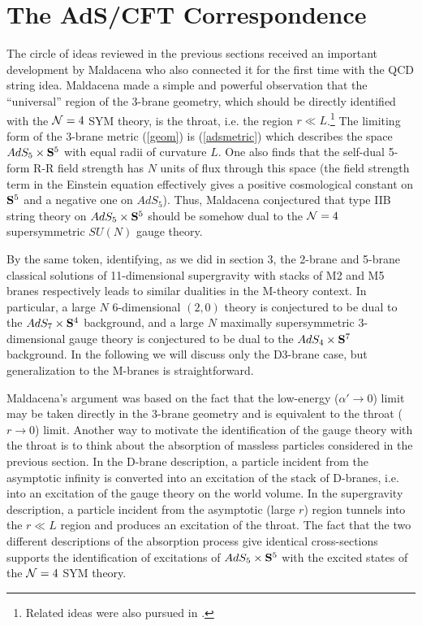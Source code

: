 \documentclass[12pt]{article}
\begin{document}
\section{The AdS/CFT Correspondence}

The circle of ideas reviewed in the previous sections received
an important development by Maldacena \cite{jthroat} who also connected
it for the first time with the QCD string idea. Maldacena made
a simple and powerful observation that the ``universal'' region of
the 3-brane geometry, which should be directly identified with the
${\cal N}=4$ SYM theory, is the throat, i.e. the region $r\ll L$.\footnote{
Related ideas were also pursued in \cite{HYU}.} The
limiting form of the 3-brane metric (\ref{geom}) is (\ref{adsmetric})
which describes the space
$AdS_5\times {\bf S}^5$ with equal radii of curvature $L$.
One also finds that the self-dual 5-form R-R field strength
has $N$ units of flux through this space (the field strength term in the
Einstein equation effectively gives a positive cosmological 
constant on ${\bf S}^5$
and a negative one on $AdS_5$).
Thus, Maldacena conjectured that type IIB string theory on 
$AdS_5\times {\bf S}^5$
should be somehow dual to the 
${\cal N}=4$ supersymmetric
$SU(N)$ gauge theory.

By the same token, identifying, as we did in section 3,
the 2-brane and 5-brane
classical solutions
of 11-dimensional supergravity with stacks of M2 and M5 branes respectively
leads to similar dualities in the M-theory
context. In particular, a large $N$ 6-dimensional $(2,0)$ theory
is conjectured to be dual to the $AdS_7\times {\bf S}^4$ background,
and a large $N$ maximally supersymmetric 3-dimensional
gauge theory is conjectured to be dual to the $AdS_4\times {\bf S}^7$
background. In the following we will discuss only the
D3-brane case, but generalization to the M-branes is straightforward.

Maldacena's argument was based on the fact that the low-energy
($\alpha'\rightarrow 0$) limit may be taken directly in the 3-brane
geometry and is equivalent to the throat ($r \rightarrow 0$) limit.
Another way to motivate the identification of the gauge theory
with the throat is to think about the absorption of massless particles
considered in the previous section. In the D-brane description,
a particle incident from the asymptotic infinity 
is converted into an excitation of the stack of D-branes, i.e. into
an excitation of the gauge theory on the world volume.
In the supergravity description, a particle incident from the asymptotic 
(large $r$) region tunnels into the $r\ll L$ region and produces an excitation
of the throat. The fact that the two different descriptions of
the absorption process give identical cross-sections supports the 
identification of excitations of $AdS_5\times {\bf S}^5$ with the excited
states of the ${\cal N}=4$ SYM theory.
\end{document}
